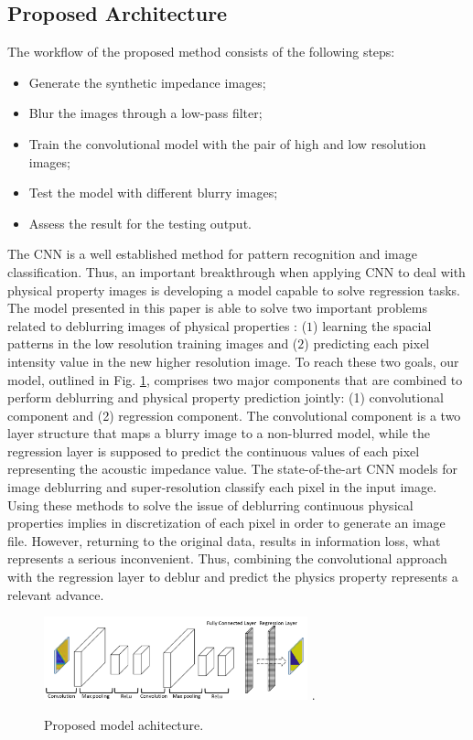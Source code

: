 \documentclass[conference]{IEEEtran}
\begin{document}
\subsection{Proposed Architecture}
The workflow of the proposed method consists of the following
steps:
\begin{itemize}
 \item Generate the synthetic impedance images;
 \item Blur the images through a low-pass filter;
 \item Train the convolutional model with the pair of high and low resolution images;
 \item Test the model with different blurry images;
 \item Assess the result for the testing output.
\end{itemize}

The CNN is a well established method for
pattern recognition and image classification.
Thus, an important breakthrough when applying CNN to
deal with physical property images is developing a model
capable to solve regression tasks. The model presented in this paper
is able to solve two important problems related to deblurring  images of physical properties
: ($1$) learning the spacial patterns in the low resolution
training images and ($2$) predicting each pixel intensity value in the new
higher resolution image. To reach these two goals, our model, outlined in Fig. \ref{fig_model},
comprises two major components that are combined to perform deblurring and physical property prediction
jointly: (1) convolutional component and (2) regression component. The convolutional component
is a two layer structure that maps a blurry image to a non-blurred model, while 
the regression layer is supposed to predict the continuous values of each pixel
representing the acoustic impedance value. 
The state-of-the-art CNN models for image deblurring \cite{Grigorios2017} and super-resolution \cite{Dahl2017}
classify each pixel in the input image. 
Using these methods to solve the issue of deblurring continuous physical properties 
implies in discretization of each pixel in order to generate an image file. However, returning
to the original data, results in information loss, what represents a serious inconvenient.
Thus, combining the convolutional approach with the regression layer to deblur and predict
the physics property represents a relevant advance.
\begin{figure}[!t]
\centering
\includegraphics[width=3.0in]{Figs/model}
\DeclareGraphicsExtensions.
\caption{Proposed model achitecture.}
\label{fig_model}
\end{figure}
\end{document}
